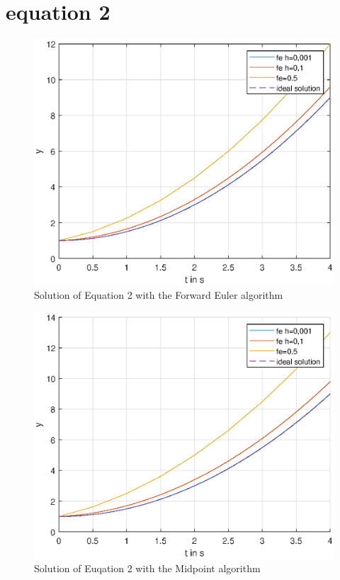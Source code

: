 \section{equation 2}
\begin{figure}[H]
    \centering
    \includegraphics[width=\plotwidth]{plots/fe_only_equation_2.eps}
    \caption{Solution of Equation 2 with the Forward Euler algorithm}
    \label{fig:eq2_fe_only}
\end{figure}

\begin{figure}[H]
    \centering
    \includegraphics[width=\plotwidth]{plots/rk_only_equation_2.eps}
    \caption{Solution of Euqation 2 with the Midpoint algorithm}
    \label{fig:eq2_rk_only}
\end{figure}

